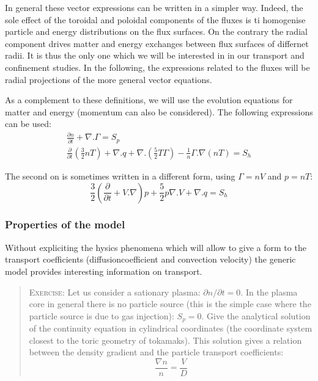 In general these vector expressions can be written in a simpler way. Indeed, the sole effect of the toroidal and poloidal components of the fluxes is ti homogenise particle and energy distributions on the flux surfaces. On the contrary the radial component drives matter and energy exchanges between flux surfaces of differnet radii. It is thus the only one which we will be interested in in our transport and confinement studies. In the following, the expressions related to the fluxes will be radial projections of the more general vector equations.

As a complement to these definitions, we will use the evolution equations for matter and energy (momentum can also be considered). The following expressions can be used:
\begin{eqnarray}
	\frac{\partial n}{\partial t}	+ \nabla. \Gamma  =  S_p	\\
	\frac{\partial}{\partial t} \left( \frac{3}{2}nT \right) + \nabla. q	+ \nabla. \left( \frac{5}{2}T\Gamma \right) - \frac{1}{n} \Gamma. \nabla \left(nT\right)	=  S_h
	\label{eq:Evolution}
\end{eqnarray}

The second on is sometimes written in a different form, using $\Gamma = nV$ and $p = nT$:
\[
\frac{3}{2} \left( \frac{\partial}{\partial t} + V.\nabla \right)p + \frac{5}{2}p\nabla.V + \nabla.q = S_h
\]

						\subsubsection{Properties of the model}
						\label{subsub:ProprietesDuModele}


Without expliciting the hysics phenomena which will allow to give a form to the transport coefficients (diffusioncoefficient and convection velocity) the generic model provides interesting information on transport.

\begin{quotation}
\textsc{Exercise:} Let us consider a sationary plasma: $\partial n / \partial t = 0$. In the plasma core in general there is no particle source (this is the simple case where the particle source is due to gas injection): $S_p = 0$. Give the analytical solution of the continuity equation in cylindrical coordinates (the coordinate system closest to the toric geometry of tokamaks). This solution gives a relation between the density gradient and the particle transport coefficients:
\[
	\frac{\nabla n}{n} = \frac{V}{D}
\]

\end{quotation}

